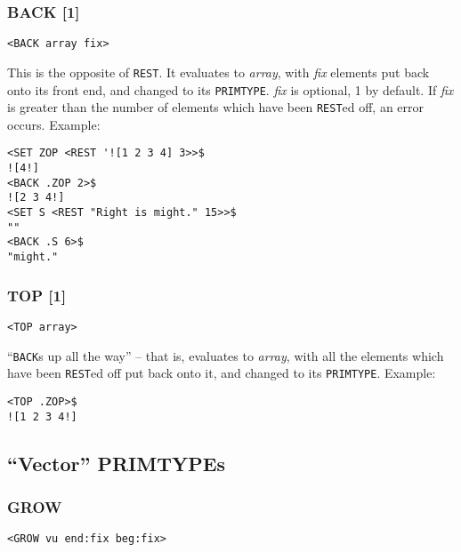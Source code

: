 \documentclass[a4paper]{scrbook}
\begin{document}
\subsubsection{BACK {[}1{]}}\label{back-1}

\begin{verbatim}
<BACK array fix>
\end{verbatim}

 This is the opposite of \texttt{REST}. It evaluates to \emph{array}, with \emph{fix} elements
put back onto its front end, and changed to its \texttt{PRIMTYPE}. \emph{fix} is optional, 1 by default. If \emph{fix} is
greater than the number of elements which have been \texttt{REST}ed off, an error occurs. Example:

\begin{verbatim}
<SET ZOP <REST '![1 2 3 4] 3>>$
![4!]
<BACK .ZOP 2>$
![2 3 4!]
<SET S <REST "Right is might." 15>>$
""
<BACK .S 6>$
"might."
\end{verbatim}

\subsubsection{TOP {[}1{]}}\label{top-1}

\begin{verbatim}
<TOP array>
\end{verbatim}

 ``\texttt{BACK}s up all the way'' -- that is, evaluates to \emph{array}, with all the elements
which have been \texttt{REST}ed off put back onto it, and changed to its \texttt{PRIMTYPE}. Example:

\begin{verbatim}
<TOP .ZOP>$
![1 2 3 4!]
\end{verbatim}

\subsection{\texorpdfstring{``Vector'' PRIMTYPEs}{7.6.3. Vector PRIMTYPEs}}\label{vector-primtypes}

\subsubsection{GROW}\label{grow}

\begin{verbatim}
<GROW vu end:fix beg:fix>
\end{verbatim}
\end{document}
